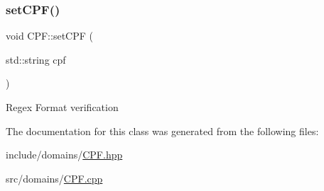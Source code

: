 \subsubsection{\texorpdfstring{setCPF()}{setCPF()}}
{\footnotesize\ttfamily void C\+P\+F\+::set\+C\+PF (\begin{DoxyParamCaption}\item[{std\+::string}]{cpf }\end{DoxyParamCaption})}

Regex Format verification 

The documentation for this class was generated from the following files\+:\begin{DoxyCompactItemize}
\item 
include/domains/\mbox{\hyperlink{_c_p_f_8hpp}{C\+P\+F.\+hpp}}\item 
src/domains/\mbox{\hyperlink{_c_p_f_8cpp}{C\+P\+F.\+cpp}}\end{DoxyCompactItemize}
